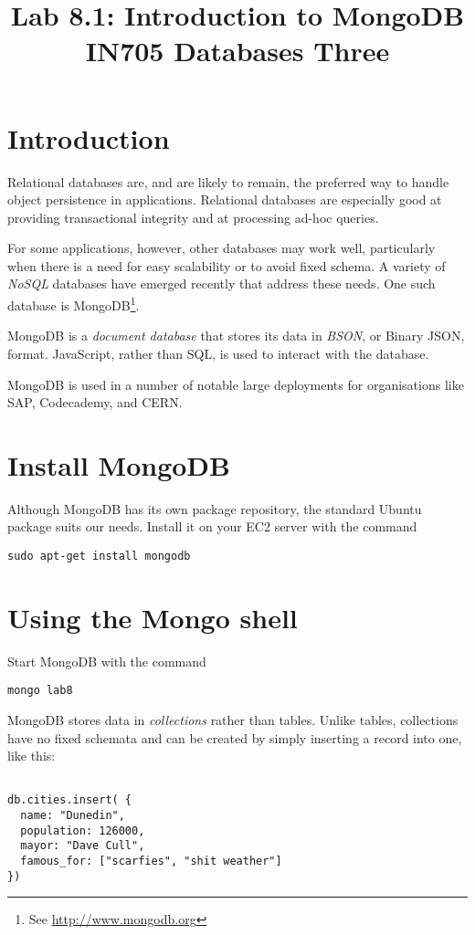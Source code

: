 \documentclass{article}
\begin{document}
\title{Lab 8.1: Introduction to MongoDB\\ IN705 Databases Three}
\date{}
\maketitle

\section*{Introduction}
Relational databases are, and are likely to remain, the preferred way to handle object persistence in applications.  Relational databases are especially good at providing transactional integrity and at processing ad-hoc queries.  

For some applications, however, other databases may work well, particularly when there is a need for easy scalability or to avoid fixed schema.  A variety of \emph{NoSQL} databases have emerged recently that address these needs.  One such database is MongoDB\footnote{See \url{http://www.mongodb.org}}.

MongoDB is a \emph{document database} that stores its data in \emph{BSON}, or Binary JSON, format.  JavaScript, rather than SQL, is used to interact with the database.

MongoDB is used in a number of notable large deployments for organisations like SAP, Codecademy, and CERN.

\section{Install MongoDB}
Although MongoDB has its own package repository, the standard Ubuntu package suits our needs.  Install it on your EC2 server with the command

\texttt{sudo apt-get install mongodb}

\section{Using the Mongo shell}
Start MongoDB with the command

\texttt{mongo lab8}

MongoDB stores data in \emph{collections} rather than tables.  Unlike tables,
collections have no fixed schemata and can be created by simply inserting a record into one, like this:

\begin{verbatim}

db.cities.insert( {
  name: "Dunedin",
  population: 126000,
  mayor: "Dave Cull",
  famous_for: ["scarfies", "shit weather"]
})

\end{verbatim}
\end{document}
